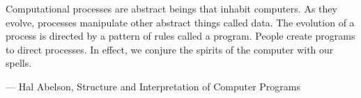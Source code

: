 \documentclass[twoside]{esi-tfg}
\begin{document}
\cover
\bastardtitle
\frontpage

\frontmatter
\copyrightpage
\jury




\dedication{To my parents and Yolanda}
\epigraph{Computational processes are abstract beings that inhabit computers. As they evolve, processes manipulate other abstract things called data. The evolution of a process is directed by a pattern of rules called a program. People create programs to direct processes. In effect, we conjure the spirits of the computer with our spells.}{--- \textup{Hal Abelson}, Structure and Interpretation of Computer Programs}


\tableofcontents
\listoftables
\listoffigures
\lstlistoflistings


\mainmatter








\appendix
\appendixtitle

{\small }

\backmatter

\cleardoublepage
\end{document}
